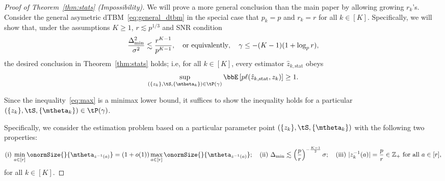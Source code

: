 \documentclass[lettersize,onecolumn,journal]{IEEEtran}
\theoremstyle{definition}
\theoremstyle{definition}
\def\fixme#1#2{\textbf{\color{red}[FIXME (#1): #2]}}
\begin{document}
\begin{proof}[Proof of Theorem~\ref{thm:stats} (Impossibility)]
We will prove a more general conclusion than the main paper by allowing growing $r_k$'s. 
Consider the general asymetric dTBM~\eqref{eq:general_dtbm} in the special case that $p_k = p$ and $r_k = r$ for all $ k\in [K]$. Specifically, we will show that, under 
the assumptions $K\geq 1$, $r\lesssim p^{1/3}$ and SNR condition
\[
{\Delta^2_{\min}\over \sigma^2}\lesssim {r^{K-1}\over p^{K-1}},\quad \text{or equivalently}, \quad \gamma\leq -(K-1)(1+\log_p r),
\]
 the desired conclusion in Theorem~\ref{thm:stats} holds; i.e, for all $k \in [K]$, every estimator $\hat z_{k,\text{stat}}$ obeys
\begin{equation}\label{eq:max}
    \sup_{(\{z_k\}, \tS, \{\mtheta_k\}) \in \tP(\gamma)} \bbE \left[ p\ell(\hat z_{k,\text{stat}}, z_k) \right]\geq 1.
\end{equation}

Since the inequality~\eqref{eq:max} is a minimax lower bound, it suffices to show the inequality holds for a particular $(\{z_k\}, \tS, \{\mtheta_k\}) \in \tP(\gamma)$. 

{
\color{blue} 

Specifically, we consider the estimation problem based on a particular parameter point $(\{z_k\}, \tS, \{\mtheta_k\})$ with the following two properties:
\begin{equation}\label{eq:construction}
\text{(i)}\  {\min_{a\in[r]} \onormSize{}{\mtheta_{z^{-1}(a)}}=\left(1+o(1)\right)\max_{a\in[r]}\onormSize{}{\mtheta_{z^{-1}(a)}}}; \quad  \text{(ii)}\ 
    \Delta_{\min}\lesssim  \left({p\over r}\right)^{-\frac{K-1}{2}}\sigma; \quad  \text{(iii)}\ |z^{-1}_k(a)|={p \over r} \in \mathbb{Z}_+ \text{ for all }a\in[r],
\end{equation}
for all $k \in [K]$.

}
\end{proof}
\end{document}

